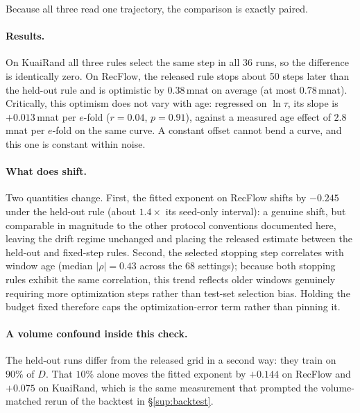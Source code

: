 \documentclass[10pt,letterpaper]{article}
\begin{document}
Because all three read one trajectory, the comparison is exactly paired.

\paragraph{Results.}
On KuaiRand all three rules select the same step in all 36 runs, so the
difference is identically zero. On RecFlow, the released rule stops about 50
steps later than the held-out rule and is optimistic by $0.38$\,mnat on
average (at most $0.78$\,mnat). Critically, this optimism does not vary with age:
regressed on $\ln\tau$, its slope is $+0.013$\,mnat per $e$-fold
($r = 0.04$, $p = 0.91$), against a measured age effect of $2.8$\,mnat per
$e$-fold on the same curve. A constant offset cannot bend a curve, and this
one is constant within noise.

\paragraph{What does shift.}
Two quantities change. First, the fitted exponent on RecFlow shifts by $-0.245$ under
the held-out rule (about $1.4\times$ its seed-only interval): a genuine shift, but
comparable in magnitude to the other protocol conventions documented here, leaving the drift regime
unchanged and placing the released estimate between the held-out and fixed-step rules. Second, the
selected stopping step correlates with window age (median $|\rho| = 0.43$ across the 68
settings); because both stopping rules exhibit the same correlation, this trend
reflects older windows genuinely requiring more optimization steps rather than
test-set selection bias. Holding the budget fixed therefore caps the
optimization-error term rather than pinning it.

\paragraph{A volume confound inside this check.}
The held-out runs differ from the released grid in a second way: they train
on $90\%$ of $D$. That $10\%$ alone moves the fitted exponent by $+0.144$ on
RecFlow and $+0.075$ on KuaiRand, which is the same measurement that
prompted the volume-matched rerun of the backtest in \S\ref{sup:backtest}.
\end{document}
